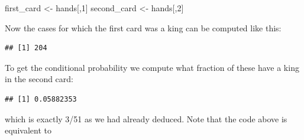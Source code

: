 \documentclass[
  openany]{book}
\newenvironment{Shaded}{\begin{snugshade}}{\end{snugshade}}
\newcommand{\DecValTok}[1]{\textcolor[rgb]{0.00,0.00,0.81}{#1}}
\newcommand{\KeywordTok}[1]{\textcolor[rgb]{0.13,0.29,0.53}{\textbf{#1}}}
\newcommand{\NormalTok}[1]{#1}
\newcommand{\OperatorTok}[1]{\textcolor[rgb]{0.81,0.36,0.00}{\textbf{#1}}}
\newcommand{\StringTok}[1]{\textcolor[rgb]{0.31,0.60,0.02}{#1}}
\begin{document}
\begin{Shaded}
\begin{Highlighting}[]
\NormalTok{first_card <-}\StringTok{ }\NormalTok{hands[,}\DecValTok{1}\NormalTok{]}
\NormalTok{second_card <-}\StringTok{ }\NormalTok{hands[,}\DecValTok{2}\NormalTok{]}
\end{Highlighting}
\end{Shaded}

Now the cases for which the first card was a king can be computed like this:

\begin{Shaded}
\end{Shaded}

\begin{verbatim}
## [1] 204
\end{verbatim}

To get the conditional probability we compute what fraction of these have a king in the second card:

\begin{Shaded}
\end{Shaded}

\begin{verbatim}
## [1] 0.05882353
\end{verbatim}

which is exactly 3/51 as we had already deduced. Note that the code above is equivalent to

\begin{Shaded}
\end{Shaded}
\end{document}

